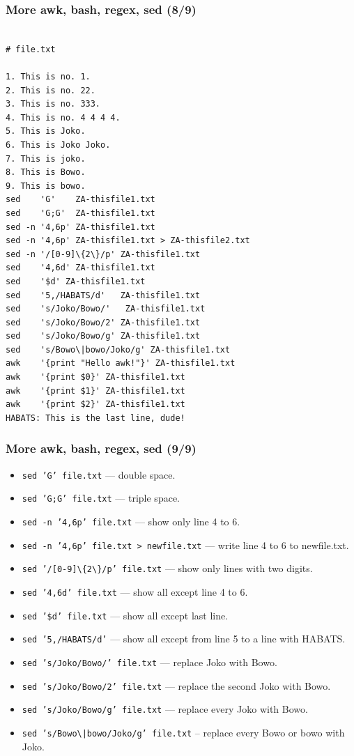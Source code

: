 \documentclass[aspectratio=169, xcolor=table, notheorems, hyperref={pdfpagelabels=false}]{beamer}
\begin{document}
\begin{frame}[fragile]
\frametitle{More awk, bash, regex, sed (8/9)}
\begin{lstlisting}[basicstyle=\ttfamily\tiny]

# file.txt

1. This is no. 1.
2. This is no. 22.
3. This is no. 333.  
4. This is no. 4 4 4 4.
5. This is Joko.
6. This is Joko Joko.
7. This is joko.
8. This is Bowo.
9. This is bowo.
sed    'G'    ZA-thisfile1.txt
sed    'G;G'  ZA-thisfile1.txt
sed -n '4,6p' ZA-thisfile1.txt
sed -n '4,6p' ZA-thisfile1.txt > ZA-thisfile2.txt
sed -n '/[0-9]\{2\}/p' ZA-thisfile1.txt
sed    '4,6d' ZA-thisfile1.txt
sed    '$d' ZA-thisfile1.txt
sed    '5,/HABATS/d'   ZA-thisfile1.txt
sed    's/Joko/Bowo/'   ZA-thisfile1.txt
sed    's/Joko/Bowo/2' ZA-thisfile1.txt
sed    's/Joko/Bowo/g' ZA-thisfile1.txt
sed    's/Bowo\|bowo/Joko/g' ZA-thisfile1.txt
awk    '{print "Hello awk!"}' ZA-thisfile1.txt
awk    '{print $0}' ZA-thisfile1.txt
awk    '{print $1}' ZA-thisfile1.txt
awk    '{print $2}' ZA-thisfile1.txt
HABATS: This is the last line, dude!

\end{lstlisting}
\end{frame}


\begin{frame}[fragile]
\frametitle{More awk, bash, regex, sed (9/9)}
\begin{itemize}
\item \texttt{sed 'G'    file.txt} --- double space.
\item \texttt{sed 'G;G'  file.txt} --- triple space.
\item \texttt{sed -n '4,6p'  file.txt} --- show only line 4 to 6.
\item \texttt{sed -n '4,6p'  file.txt > newfile.txt} --- write line 4 to 6 to newfile.txt.
\item \texttt{sed '/[0-9]\textbackslash\{2\textbackslash\}/p' file.txt} --- show only lines with two digits. 
\item \texttt{sed '4,6d'     file.txt} --- show all except line 4 to 6.
\item \texttt{sed '\$d'      file.txt} --- show all except last line.
\item \texttt{sed '5,/HABATS/d'} --- show all except from line 5 to a line with HABATS.
\item \texttt{sed 's/Joko/Bowo/'  file.txt} --- replace Joko with Bowo.
\item \texttt{sed 's/Joko/Bowo/2' file.txt} --- replace the second Joko with Bowo.
\item \texttt{sed 's/Joko/Bowo/g' file.txt} --- replace every Joko with Bowo.
\item \texttt{sed 's/Bowo\textbackslash{}|bowo/Joko/g' file.txt} -- replace every Bowo or bowo with Joko.
\end{itemize}
\end{frame}
\end{document}
